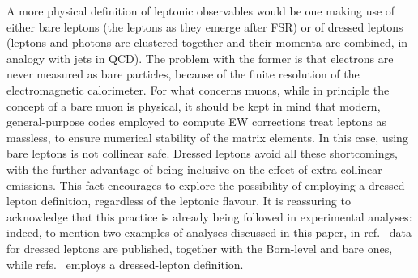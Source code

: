 A more physical definition of leptonic observables would be one making use of either bare leptons (the leptons as they emerge after FSR)
or of dressed leptons (leptons and photons are clustered together and their momenta are combined, in analogy with jets in QCD). The problem with the former is that 
electrons are never measured as bare particles, because of the finite resolution 
of the electromagnetic calorimeter. For what concerns muons, while in principle the concept of a bare muon is physical, it should be kept in
mind that modern, general-purpose codes employed to
compute EW corrections treat leptons as massless, to ensure numerical stability of the matrix elements. In this case, using bare leptons is not collinear safe.
Dressed leptons avoid all these shortcomings, with the further advantage of being
inclusive on the effect of extra collinear emissions. This fact encourages to explore the possibility of employing a dressed-lepton
definition, regardless of the leptonic flavour. It is reassuring to acknowledge that this practice is already being followed in experimental analyses:
indeed, to mention two examples of analyses discussed in this paper, in ref.~\cite{Aad:2015auj} data for dressed leptons are published, together with the Born-level
and bare ones, while refs.~\cite{Sirunyan:2019bzr} employs a dressed-lepton definition.
